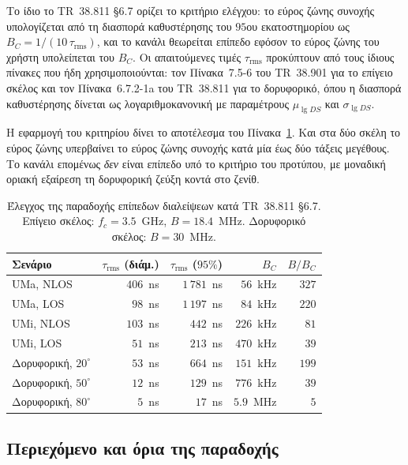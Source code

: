 Το ίδιο το TR~38.811 §6.7 ορίζει το κριτήριο ελέγχου: το εύρος ζώνης
συνοχής υπολογίζεται από τη διασπορά καθυστέρησης του $95$ου εκατοστημορίου
ως $B_C = 1/(10\,\tau_{\text{rms}})$, και το κανάλι θεωρείται επίπεδο
εφόσον το εύρος ζώνης του χρήστη υπολείπεται του $B_C$. Οι απαιτούμενες
τιμές $\tau_{\text{rms}}$ προκύπτουν από τους ίδιους πίνακες που ήδη
χρησιμοποιούνται: τον Πίνακα~7.5-6 του TR~38.901 για το επίγειο σκέλος και
τον Πίνακα~6.7.2-1a του TR~38.811 για το δορυφορικό, όπου η διασπορά
καθυστέρησης δίνεται ως λογαριθμοκανονική με παραμέτρους $\mu_{\lg DS}$ και
$\sigma_{\lg DS}$.

Η εφαρμογή του κριτηρίου δίνει το αποτέλεσμα του
Πίνακα~\ref{tab:coherence-bw}. Και στα δύο σκέλη το εύρος ζώνης υπερβαίνει
το εύρος ζώνης συνοχής κατά μία έως δύο τάξεις μεγέθους. Το κανάλι
επομένως \emph{δεν} είναι επίπεδο υπό το κριτήριο του προτύπου, με μοναδική
οριακή εξαίρεση τη δορυφορική ζεύξη κοντά στο ζενίθ.

\begin{table}[htbp]
\centering
\caption{Έλεγχος της παραδοχής επίπεδων διαλείψεων κατά TR~38.811 §6.7.
Επίγειο σκέλος: $f_c = 3.5$~GHz, $B = 18.4$~MHz. Δορυφορικό σκέλος:
$B = 30$~MHz.}
\label{tab:coherence-bw}
\small
\begin{tabular}{@{}lrrrr@{}}
\toprule
Σενάριο & $\tau_{\text{rms}}$ (διάμ.) & $\tau_{\text{rms}}$ ($95\%$)
& $B_C$ & $B/B_C$ \\
\midrule
UMa, NLOS                & $406$~ns & $1\,781$~ns & $56$~kHz  & $327$ \\
UMa, LOS                 & $98$~ns  & $1\,197$~ns & $84$~kHz  & $220$ \\
UMi, NLOS                & $103$~ns & $442$~ns    & $226$~kHz & $81$  \\
UMi, LOS                 & $51$~ns  & $213$~ns    & $470$~kHz & $39$  \\
\midrule
Δορυφορική, $20^\circ$   & $53$~ns  & $664$~ns    & $151$~kHz & $199$ \\
Δορυφορική, $50^\circ$   & $12$~ns  & $129$~ns    & $776$~kHz & $39$  \\
Δορυφορική, $80^\circ$   & $5$~ns   & $17$~ns     & $5.9$~MHz & $5$   \\
\bottomrule
\end{tabular}
\end{table}

\subsection{Περιεχόμενο και όρια της παραδοχής}

